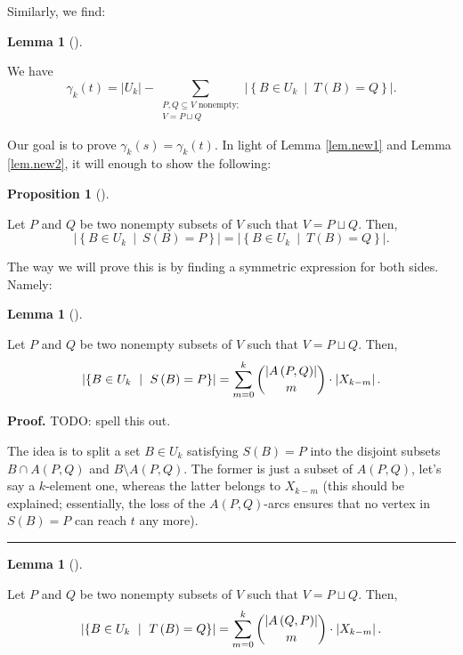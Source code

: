 \documentclass[numbers=enddot,12pt,final,onecolumn,notitlepage]{scrartcl}%
\theoremstyle{definition}
\newtheorem{lem}[theo]{Lemma}
\newenvironment{lemma}[1][]
{\begin{lem}[#1]\begin{leftbar}}
{\end{leftbar}\end{lem}}
\newtheorem{prop}[theo]{Proposition}
\newenvironment{proposition}[1][]
{\begin{prop}[#1]\begin{leftbar}}
{\end{leftbar}\end{prop}}
\newenvironment{proof}[1][Proof]{\noindent\textbf{#1.} }{\ \rule{0.5em}{0.5em}}
\let\sumnonlimits\sum
\renewcommand{\sum}{\sumnonlimits\limits}
\theoremstyle{plainsl}
\begin{document}
Similarly, we find:

\begin{lemma}
\label{lem.new2}We have%
\[
\gamma_{k}\left(  t\right)  =\left\vert U_{k}\right\vert -\sum
_{\substack{P,Q\subseteq V\text{ nonempty;}\\V=P\sqcup Q}}\left\vert \left\{
B\in U_{k}\ \mid\ T\left(  B\right)  =Q\right\}  \right\vert .
\]

\end{lemma}

Our goal is to prove $\gamma_{k}\left(  s\right)  =\gamma_{k}\left(  t\right)
$. In light of Lemma \ref{lem.new1} and Lemma \ref{lem.new2}, it will enough
to show the following:

\begin{proposition}
\label{prop.new3}Let $P$ and $Q$ be two nonempty subsets of $V$ such that
$V=P\sqcup Q$. Then,%
\[
\left\vert \left\{  B\in U_{k}\ \mid\ S\left(  B\right)  =P\right\}
\right\vert =\left\vert \left\{  B\in U_{k}\ \mid\ T\left(  B\right)
=Q\right\}  \right\vert .
\]

\end{proposition}

The way we will prove this is by finding a symmetric expression for both
sides. Namely:

\begin{lemma}
\label{lem.new4}Let $P$ and $Q$ be two nonempty subsets of $V$ such that
$V=P\sqcup Q$. Then,%
\[
\left\vert \left\{  B\in U_{k}\ \mid\ S\left(  B\right)  =P\right\}
\right\vert =\sum_{m=0}^{k}\dbinom{\left\vert A\left(  P,Q\right)  \right\vert
}{m}\cdot\left\vert X_{k-m}\right\vert .
\]

\end{lemma}

\begin{proof}
TODO: spell this out.

The idea is to split a set $B\in U_{k}$ satisfying $S\left(  B\right)  =P$
into the disjoint subsets $B\cap A\left(  P,Q\right)  $ and $B\setminus
A\left(  P,Q\right)  $. The former is just a subset of $A\left(  P,Q\right)
$, let's say a $k$-element one, whereas the latter belongs to $X_{k-m}$ (this
should be explained; essentially, the loss of the $A\left(  P,Q\right)  $-arcs
ensures that no vertex in $S\left(  B\right)  =P$ can reach $t$ any more).
\end{proof}



\begin{lemma}
\label{lem.new5}Let $P$ and $Q$ be two nonempty subsets of $V$ such that
$V=P\sqcup Q$. Then,%
\[
\left\vert \left\{  B\in U_{k}\ \mid\ T\left(  B\right)  =Q\right\}
\right\vert =\sum_{m=0}^{k}\dbinom{\left\vert A\left(  Q,P\right)  \right\vert
}{m}\cdot\left\vert X_{k-m}\right\vert .
\]

\end{lemma}
\end{document}
